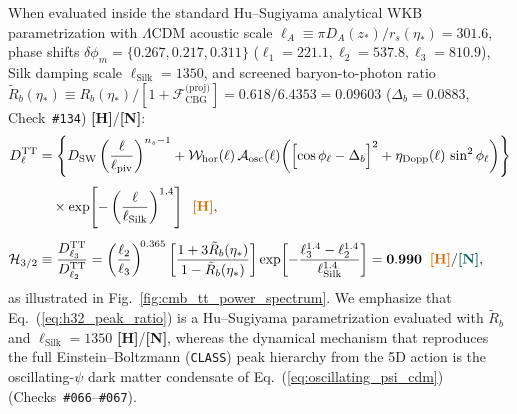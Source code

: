\documentclass[11pt,a4paper]{article}
\newcommand{\catH}{\textbf{\textcolor{orange!85!black}{[H]}}}
\newcommand{\catN}{\textbf{\textcolor{teal!75!black}{[N]}}}
\theoremstyle{plain}
\theoremstyle{definition}
\theoremstyle{remark}
\numberwithin{equation}{section}
\begin{document}
When evaluated inside the standard Hu--Sugiyama analytical WKB parametrization \cite{hu1995} with $\Lambda\text{CDM}$ acoustic scale $\ell_A \equiv \pi D_A(z_*)/r_s(\eta_*) = 301.6$, phase shifts $\delta\phi_m = \{0.267, 0.217, 0.311\}$ ($\ell_1 = 221.1, \ell_2 = 537.8, \ell_3 = 810.9$), Silk damping scale $\ell_{\text{Silk}} = 1350$, and screened baryon-to-photon ratio $\tilde{R}_b(\eta_*) \equiv R_b(\eta_*)/[1 + \mathcal{F}_{\text{CBG}}^{\text{(proj)}}] = 0.618 / 6.4353 = 0.09603$ ($\Delta_b = 0.0883$, Check~\texttt{\#134}) \catH/\catN:
\begin{align}
D_\ell^{\text{TT}} &= \Biggl\{ D_{\text{SW}}\left(\frac{\ell}{\ell_{\text{piv}}}\right)^{n_s - 1} + \mathcal{W}_{\text{hor}}(\ell)\,\mathcal{A}_{\text{osc}}(\ell)\biggl( \Bigl[ \cos\phi_\ell - \Delta_b \Bigr]^2 + \eta_{\text{Dopp}}(\ell)\,\sin^2\phi_\ell \biggr) \Biggr\} \nonumber \\[3pt]
&\quad \times \exp\!\left[-\left(\frac{\ell}{\ell_{\text{Silk}}}\right)^{1.4}\right] \;\;\catH, \label{eq:exact_closed_form_dl_tt} \\[5pt]
\mathcal{H}_{3/2} &\equiv \frac{D_{\ell_3}^{\text{TT}}}{D_{\ell_2}^{\text{TT}}} = \left(\frac{\ell_2}{\ell_3}\right)^{\!0.365} \left[ \frac{1 + 3 \tilde{R}_b(\eta_*)}{1 - \tilde{R}_b(\eta_*)} \right] \exp\!\left[ -\frac{\ell_3^{1.4} - \ell_2^{1.4}}{\ell_{\text{Silk}}^{1.4}} \right] = \mathbf{0.990} \;\;\catH/\catN,
\label{eq:h32_peak_ratio}
\end{align}
as illustrated in Fig.~\ref{fig:cmb_tt_power_spectrum}. We emphasize that Eq.~(\ref{eq:h32_peak_ratio}) is a Hu--Sugiyama parametrization evaluated with $\tilde{R}_b$ and $\ell_{\text{Silk}} = 1350$ \catH/\catN, whereas the dynamical mechanism that reproduces the full Einstein--Boltzmann (\texttt{CLASS}) peak hierarchy from the 5D action is the oscillating-$\psi$ dark matter condensate of Eq.~(\ref{eq:oscillating_psi_cdm}) (Checks~\texttt{\#066}--\texttt{\#067}).
\end{document}
